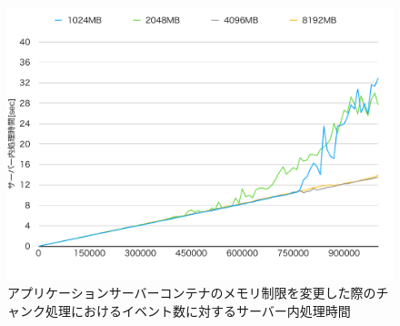 \documentclass[../../../../../main]{subfiles}
\begin{document}
    \begin{figure}[H]
        \centering
        \includegraphics[width=12cm]{graph}
        \caption{アプリケーションサーバーコンテナのメモリ制限を変更した際のチャンク処理におけるイベント数に対するサーバー内処理時間}
        \label{fig:stream-change-app-memory-limit-server-time-app_4_db_1_1024}
    \end{figure}
\end{document}
